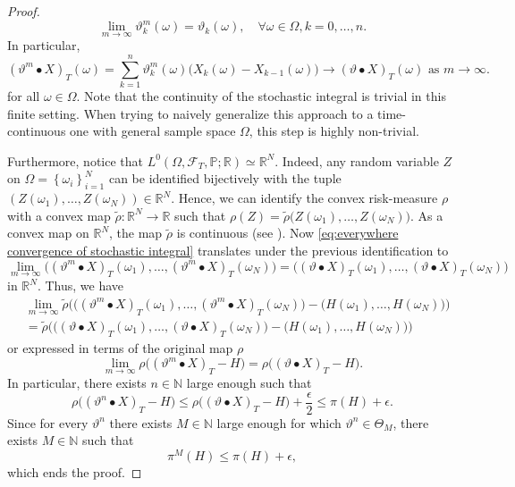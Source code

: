 \documentclass[11pt,a4paper,twoside,openany]{report}
\numberwithin{equation}{section}
\theoremstyle{plain} %
\theoremstyle{definition} %
\theoremstyle{remark} %
\let\parencite\authnumparencite
\begin{document}
\begin{proof}
 \begin{equation*}
     \lim_{m\to\infty}\vartheta_k^m(\omega)=\vartheta_k(\omega),\quad\forall\omega\in\Omega,k=0,\dots,n.
 \end{equation*}
 In particular, 
 \begin{equation}\label{eq:everywhere convergence of stochastic integral}
(\vartheta^m\bullet X)_T(\omega)=\sum_{k=1}^{n}\vartheta^m_k(\omega)\big(X_{k}(\omega)-X_{k-1}(\omega)\big)\to(\vartheta\bullet X)_T(\omega)\text{ as }m\to\infty.
\end{equation}
 for all \(\omega\in\Omega\).
Note that the continuity of the stochastic integral is trivial in this finite setting. When trying to naively generalize this approach to a time-continuous one with general sample space \(\Omega\), this step is highly non-trivial.


 Furthermore, notice that \( L^0(\Omega,\mathcal{F}_T,\mathbb{P};\mathbb{R})\simeq\mathbb{R}^{N}\). Indeed, any random variable \(Z\) on \(\Omega=\left\{\omega_i\right\}_{i=1}^N\) can be identified bijectively with the tuple \((Z(\omega_1),\dots,Z(\omega_N))\in\mathbb{R}^N\). Hence, we can identify the convex risk-measure \(\rho\) with a convex map \(\tilde{\rho}:\mathbb{R}^{N}\to\mathbb{R}\) such that \(\rho(Z)=\widetilde{\rho}\big(Z(\omega_1),\dots,Z(\omega_N)\big)\). As a convex map on \(\mathbb{R}^N\), the map \(\widetilde{\rho}\) is continuous (see \parencite[Thm.~10.1]{Rockafellar1970ConvexAnalysis}). Now \eqref{eq:everywhere convergence of stochastic integral} translates under the previous identification to 
 \begin{equation*}
     \lim_{m\to\infty}
\big((\vartheta^m\bullet X)_T(\omega_1),\dots, (\vartheta^m\bullet X)_T(\omega_N)\big)=\big((\vartheta\bullet X)_T(\omega_1),\dots, (\vartheta\bullet X)_T(\omega_N)\big)
\end{equation*}
in \(\mathbb{R}^N\).
 Thus, we have
  \begin{align*}
     &\lim_{m\to\infty}\widetilde{\rho}\Big(\big((\vartheta^m\bullet X)_T(\omega_1),\dots, (\vartheta^m\bullet X)_T(\omega_N)\big)-(H(\omega_1),\dots,H(\omega_N)\big)\Big)
     \\&=\widetilde{\rho}\Big(\big((\vartheta\bullet X)_T(\omega_1),\dots, (\vartheta\bullet X)_T(\omega_N)\big)-(H(\omega_1),\dots,H(\omega_N)\big)\Big)
\end{align*}
 or expressed in terms of the original map \(\rho\)
 \begin{equation*}
     \lim_{m\to\infty}\rho\big((\vartheta^m\bullet X)_T-H\big)=\rho\big((\vartheta\bullet X)_T-H\big).
\end{equation*}
In particular, there exists \(n\in\mathbb{N}\) large enough such that 
\begin{equation*}
    \rho\big((\vartheta^n\bullet X)_T-H\big)\leq\rho\big((\vartheta\bullet X)_T-H\big)+\frac{\epsilon}{2}\leq\pi(H)+\epsilon.
\end{equation*}
Since for every \(\vartheta^n\) there exists \(M\in\mathbb{N}\) large enough for which \(\vartheta^n\in\Theta_M\), there exists \(M\in\mathbb{N}\) such that 
\begin{equation*}
    \pi^M(H)\leq\pi(H)+\epsilon,
\end{equation*}
which ends the proof.
\end{proof}
\end{document}
